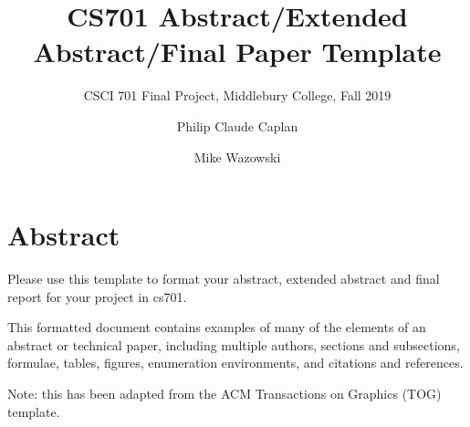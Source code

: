 \documentclass[acmtog,review]{acmart}
\begin{document}
\title{CS701 Abstract/Extended Abstract/Final Paper Template}

\subtitle{CSCI 701 Final Project, Middlebury College, Fall 2019}

\author{Philip Claude Caplan}

\author{Mike Wazowski}

\maketitle

\section*{Abstract}
Please use this template to format your abstract, extended abstract and final report for your project in cs701.

This formatted document contains examples of many of the elements of an abstract or technical paper, including multiple authors, sections and subsections, formulae, tables, figures, enumeration environments, and citations and references.

Note: this has been adapted from the ACM Transactions on Graphics (TOG) template.










\end{document}
